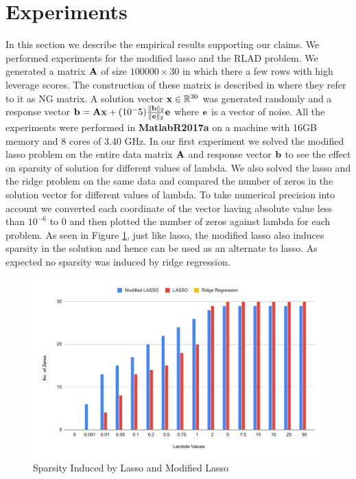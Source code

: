 \section{Experiments}
In this section we describe the empirical results supporting our claims. We performed experiments for the modified lasso and the RLAD problem. We generated a matrix $\mathbf{A}$ of size $100000 \times 30$ in which there a few rows with high leverage scores. The construction of these matrix is described in \cite{yang2015implementing} where they refer to it as NG matrix. A solution vector $\mathbf{x} \in \mathbb{R}^{30}$ was generated randomly and a response vector $\mathbf{b= Ax} + (10^-5)\frac{\|\mathbf{b}\|_2}{\|\mathbf{e}\|_2}\mathbf{e}$ where $\mathbf{e}$ is a vector of noise. All the experiments were performed in \textbf{MatlabR2017a} on a machine with 16GB memory and 8 cores of 3.40 GHz. In our first experiment we solved the modified lasso problem on the entire data matrix $\mathbf{A}$ and response vector $\mathbf{b}$ to see the effect on sparsity of solution for different values of lambda. We also solved the lasso and the ridge problem on the same data and compared the number of zeros in the solution vector for different values of lambda. To take numerical precision into account we converted each coordinate of the vector having absolute value less than $10^{-6}$ to $0$ and then plotted the number of zeros against lambda for each problem. As seen in Figure \ref{ModifiedLASSOsparse}, just like lasso, the modified lasso also induces sparsity in the solution and hence can be used as an alternate to lasso. As expected no sparsity was induced by ridge regression.
\begin{figure}[ht]
\vskip 0.2in
\begin{center}
\centerline{\includegraphics[width=\columnwidth]{"chart"}}
\caption{Sparsity Induced by Lasso and Modified Lasso}
\label{ModifiedLASSOsparse}
\end{center}
\vskip -0.2in
\end{figure}
